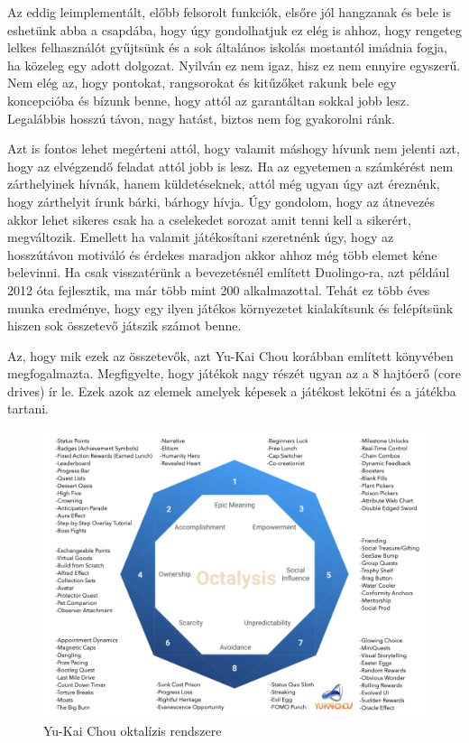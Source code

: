 

Az eddig leimplementált, előbb felsorolt funkciók, elsőre jól hangzanak és bele is eshetünk abba a csapdába, hogy úgy gondolhatjuk ez elég is ahhoz, hogy rengeteg lelkes felhasználót gyűjtsünk és a sok általános iskolás mostantól imádnia fogja, ha közeleg egy adott dolgozat. Nyilván ez nem igaz, hisz ez nem ennyire egyszerű. Nem elég az, hogy pontokat, rangsorokat és kitűzőket rakunk bele egy koncepcióba és bízunk benne, hogy attól az garantáltan sokkal jobb lesz. Legalábbis hosszú távon, nagy hatást, biztos nem fog gyakorolni ránk. \newline

Azt is fontos lehet megérteni attól, hogy valamit máshogy hívunk nem jelenti azt, hogy az elvégzendő feladat attól jobb is lesz. Ha az egyetemen a számkérést nem zárthelyinek hívnák, hanem küldetéseknek, attól még ugyan úgy azt éreznénk, hogy zárthelyit írunk bárki, bárhogy hívja. Úgy gondolom, hogy az átnevezés akkor lehet sikeres csak ha a cselekedet sorozat amit tenni kell a sikerért, megváltozik. Emellett ha valamit játékosítani szeretnénk úgy, hogy az hosszútávon motiváló és érdekes maradjon akkor ahhoz még több elemet kéne belevinni. Ha csak visszatérünk a bevezetésnél említett Duolingo-ra, azt például 2012 óta fejlesztik, ma már több mint 200 alkalmazottal. Tehát ez több éves munka eredménye, hogy egy ilyen játékos környezetet kialakítsunk és felépítsünk hiszen sok összetevő játszik számot benne. \newline

Az, hogy mik ezek az összetevők, azt Yu-Kai Chou korábban említett könyvében \cite{actionablegamification} megfogalmazta. Megfigyelte, hogy játékok nagy részét ugyan az a 8 hajtóerő (core drives) ír le. Ezek azok az elemek amelyek képesek a játékost lekötni és a játékba tartani.

\begin{figure}[H]
    \centering
    \includegraphics[width=\linewidth]{images/gamification-framework.jpg}
    \caption{Yu-Kai Chou oktalízis rendszere}
    \label{fig:gamification-framework}
\end{figure}

